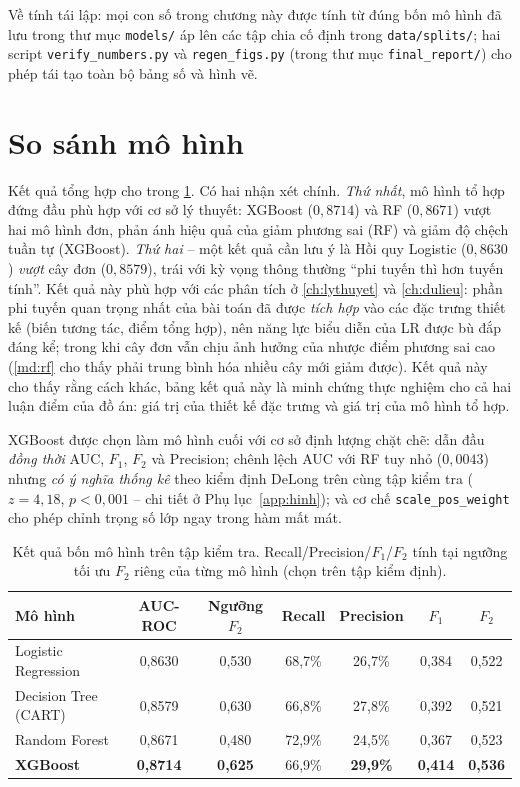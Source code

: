 \documentclass[12pt,a4paper,oneside]{report}
\theoremstyle{vnplain}
\theoremstyle{vndef}
\begin{document}
Về tính tái lập: mọi con số trong chương này được tính từ đúng bốn mô hình đã lưu
trong thư mục \texttt{models/} áp lên các tập chia cố định trong
\texttt{data/splits/}; hai script \texttt{verify\_numbers.py} và
\texttt{regen\_figs.py} (trong thư mục \texttt{final\_report/}) cho phép tái tạo
toàn bộ bảng số và hình vẽ.

\section{So sánh mô hình}
Kết quả tổng hợp cho trong \cref{tab:sosanh}. Có hai nhận xét chính. \emph{Thứ nhất},
mô hình tổ hợp đứng đầu phù hợp với cơ sở lý thuyết: XGBoost ($0{,}8714$) và RF ($0{,}8671$) vượt
hai mô hình đơn, phản ánh hiệu quả của giảm phương sai (RF) và giảm độ chệch tuần tự
(XGBoost). \emph{Thứ hai} -- một kết quả cần lưu ý là Hồi quy Logistic ($0{,}8630$) \emph{vượt} cây
đơn ($0{,}8579$), trái với kỳ vọng thông thường ``phi tuyến thì hơn tuyến tính''. Kết quả này phù hợp với các phân tích
ở \cref{ch:lythuyet} và \cref{ch:dulieu}: phần phi tuyến quan trọng nhất
của bài toán đã được \emph{tích hợp} vào các đặc trưng thiết kế (biến tương tác, điểm tổng
hợp), nên năng lực biểu diễn của LR được bù đắp đáng kể; trong khi cây đơn vẫn chịu ảnh hưởng của nhược điểm
phương sai cao (\cref{md:rf} cho thấy phải trung bình hóa nhiều cây mới giảm được). Kết quả này cho thấy rằng
cách khác, bảng kết quả này là minh chứng thực nghiệm cho cả hai luận điểm của đồ án:
giá trị của thiết kế đặc trưng và giá trị của mô hình tổ hợp.

XGBoost được chọn làm mô hình cuối với cơ sở định lượng chặt chẽ: dẫn đầu \emph{đồng
thời} AUC, $F_1$, $F_2$ và Precision; chênh lệch AUC với RF tuy nhỏ ($0{,}0043$) nhưng
\emph{có ý nghĩa thống kê} theo kiểm định DeLong trên cùng tập kiểm tra ($z=4{,}18$,
$p<0{,}001$ -- chi tiết ở Phụ lục~\ref{app:hinh}); và cơ chế
\texttt{scale\_pos\_weight} cho phép chỉnh trọng số lớp ngay trong hàm mất mát.

\begin{table}[htbp]\centering
\caption{Kết quả bốn mô hình trên tập kiểm tra. Recall/Precision/$F_1$/$F_2$ tính tại
ngưỡng tối ưu $F_2$ riêng của từng mô hình (chọn trên tập kiểm định).}
\label{tab:sosanh}
\begin{tabular}{l c c c c c c}
\toprule
\textbf{Mô hình} & \textbf{AUC-ROC} & \textbf{Ngưỡng $F_2$} & \textbf{Recall} & \textbf{Precision} & \textbf{$F_1$} & \textbf{$F_2$}\\
\midrule
Logistic Regression & 0,8630 & 0,530 & 68,7\% & 26,7\% & 0,384 & 0,522\\
Decision Tree (CART) & 0,8579 & 0,630 & 66,8\% & 27,8\% & 0,392 & 0,521\\
Random Forest & 0,8671 & 0,480 & 72,9\% & 24,5\% & 0,367 & 0,523\\
\textbf{XGBoost} & \textbf{0,8714} & \textbf{0,625} & 66,9\% & \textbf{29,9\%} & \textbf{0,414} & \textbf{0,536}\\
\bottomrule
\end{tabular}
\end{table}
\end{document}

